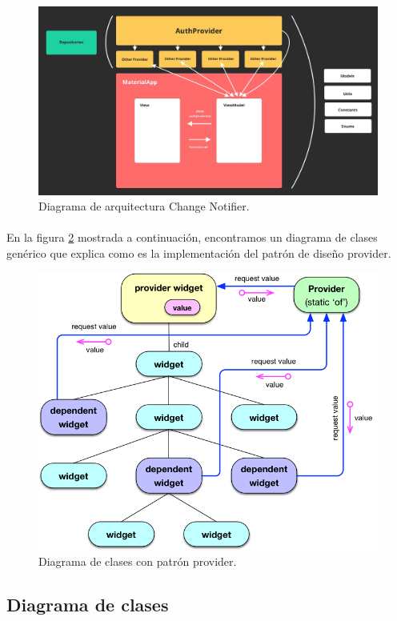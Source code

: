 \begin{figure}[H]
	\centering
	\includegraphics[width=0.85\linewidth]{figs/change-notifier}
	\caption[Arquitectura ChangeNotifier]{Diagrama de arquitectura Change Notifier.}
	\label{fig:ChangeNotifier}
\end{figure}

\paragraph{}En la figura \ref{fig:provider} mostrada a continuación, encontramos un
diagrama de clases genérico que explica como es la implementación del patrón de diseño
provider.

\begin{figure}[H]
	\centering
	\includegraphics[width=0.75\linewidth]{figs/provider-pattern}
	\caption[Patron Provider]{Diagrama de clases con patrón provider.}
	\label{fig:provider}
\end{figure}

\subsection{Diagrama de clases}

